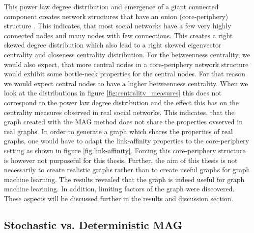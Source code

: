   \noindent This power law degree distribution and emergence of a giant
  connected component creates network structures that have an onion
  (core-periphery) structure \citep[p. 121]{kim2012multiplicative}. This
  indicates, that most social networks have a few very highly connected nodes
  and many nodes with few connections. This creates a right skewed degree 
  distribution which also lead to a right skewed eigenvector centrality and
  closeness centrality distribution. For the betweenness centrality, we would
  also expect, that more central nodes in a core-periphery network structure
  would exhibit some bottle-neck properties for the central nodes. For that
  reason we would expect central nodes to have a higher betweenness centrality.
  When we look at the distributions in figure \ref{fig:centrality_measures}
  this does not correspond to the power law degree distribution and the effect
  this has on the centrality measures observed in real social networks. This
  indicates, that the graph created with the MAG method does not share the
  properties ovserved in real graphs. In order to generate a graph which
  shares the properties of real graphs, one would have to adapt the 
  link-affinity properties to the core-periphery setting as shown in figure
  \ref{fig:link-affinity}. Forcing this core-periphery structure is however not
  purposeful for this thesis. Further, the aim of this thesis is not
  necessarily to create realistic graphs rather than to create useful graphs 
  for graph machine learning. The results revealed that the graph is indeed
  useful for graph machine learining. In addition, limiting factors of the
  graph were discovered. These aspects will be discussed further in the results
  and discussion section. 


  \subsection{Stochastic vs. Deterministic MAG}
  \label{section:stoch_det}

